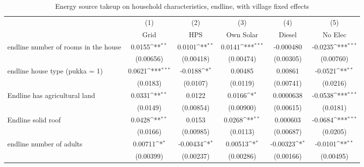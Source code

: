 \begin{table}[htbp]\centering
\def\sym#1{\ifmmode^{#1}\else\(^{#1}\)\fi}
\caption{Energy source takeup on household characteristics, endline, with village fixed effects \label{tab: LABEL}}
\begin{tabular*}{1.0\hsize}{@{\hskip\tabcolsep\extracolsep\fill}l*{5}{c}}
\toprule
                                &\multicolumn{1}{c}{(1)}&\multicolumn{1}{c}{(2)}&\multicolumn{1}{c}{(3)}&\multicolumn{1}{c}{(4)}&\multicolumn{1}{c}{(5)}\\
                                &\multicolumn{1}{c}{Grid}&\multicolumn{1}{c}{HPS}&\multicolumn{1}{c}{Own Solar}&\multicolumn{1}{c}{Diesel}&\multicolumn{1}{c}{No Elec}\\
\midrule
endline number of rooms in the house&      0.0155\sym{**} &      0.0101\sym{**} &      0.0141\sym{***}&   -0.000480         &     -0.0235\sym{***}\\
                                &   (0.00656)         &   (0.00418)         &   (0.00474)         &   (0.00305)         &   (0.00760)         \\
\addlinespace
endline house type (pukka = 1)  &      0.0621\sym{***}&     -0.0188\sym{*}  &     0.00485         &     0.00861         &     -0.0521\sym{**} \\
                                &    (0.0183)         &    (0.0107)         &    (0.0119)         &   (0.00741)         &    (0.0216)         \\
\addlinespace
Endline has agricultural land   &      0.0331\sym{**} &      0.0122         &      0.0166\sym{*}  &   0.0000638         &     -0.0538\sym{***}\\
                                &    (0.0149)         &   (0.00854)         &   (0.00900)         &   (0.00615)         &    (0.0181)         \\
\addlinespace
Endline solid roof              &      0.0428\sym{**} &      0.0153         &      0.0268\sym{**} &    0.000603         &     -0.0684\sym{***}\\
                                &    (0.0166)         &   (0.00985)         &    (0.0113)         &   (0.00687)         &    (0.0205)         \\
\addlinespace
endline number of adults        &     0.00711\sym{*}  &    -0.00434\sym{*}  &     0.00513\sym{*}  &    -0.00323\sym{*}  &     -0.0101\sym{**} \\
                                &   (0.00399)         &   (0.00237)         &   (0.00286)         &   (0.00166)         &   (0.00495)         \\

\end{tabular*}
\end{table}
